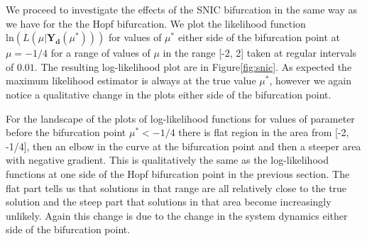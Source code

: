 We proceed to investigate the effects of the SNIC bifurcation in the same way as we have for the the Hopf bifurcation. We plot the likelihood function $\text{ln}(L(\mu | \mathbf{Y_{d}}(\mu^*)))$ for values of $\mu^*$ either side of the bifurcation point at $\mu = -1/4$ for a range of values of $\mu$ in the range [-2, 2] taken at regular intervals of $0.01$. The resulting log-likelihood plot are in Figure\ref{fig:snic}. As expected the maximum likelihood estimator is always at the true value $\mu^*$, however we again notice a qualitative change in the plots either side of the bifurcation point.

For the landscape of the plots of log-likelihood functions for values of parameter before the bifurcation point $\mu^* < -1/4$ there is flat region in the area from [-2, -1/4], then an elbow in the curve at the bifurcation point and then a steeper area with negative gradient. This is qualitatively the same as the log-likelihood functions at one side of the Hopf bifurcation point in the previous section. The flat part tells us that solutions in that range are all relatively close to the true solution and the steep part that solutions in that area become increasingly unlikely. Again this change is due to the change in the system dynamics either side of the bifurcation point.

